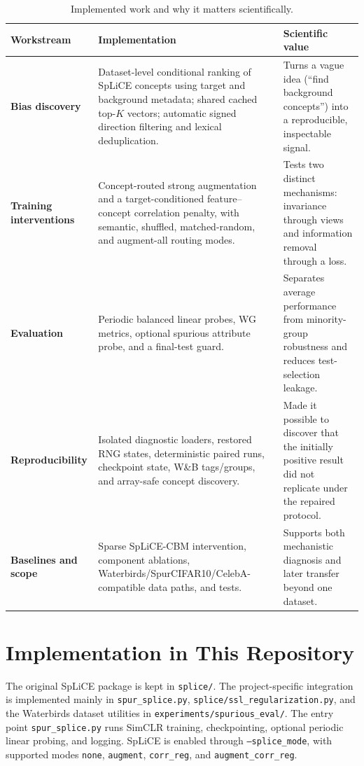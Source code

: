 \documentclass[11pt,a4paper]{article}
\begin{document}
\begin{table}[ht]
\centering
\caption{Implemented work and why it matters scientifically.}
\begin{tabularx}{\textwidth}{>{\bfseries}p{} X X}
\toprule
Workstream & Implementation & Scientific value \\
\midrule
Bias discovery & Dataset-level conditional ranking of SpLiCE concepts using
target and background metadata; shared cached top-$K$ vectors; automatic signed
direction filtering and lexical deduplication. & Turns a vague
idea (``find background concepts'') into a reproducible, inspectable signal. \\
Training interventions & Concept-routed strong augmentation and a
target-conditioned feature--concept correlation penalty, with semantic,
shuffled, matched-random, and augment-all routing modes. & Tests two distinct
mechanisms: invariance through views and information removal through a loss. \\
Evaluation & Periodic balanced linear probes, WG metrics, optional spurious
attribute probe, and a final-test guard. & Separates average performance from
minority-group robustness and reduces test-selection leakage. \\
Reproducibility & Isolated diagnostic loaders, restored RNG states, deterministic
paired runs, checkpoint state, W\&B tags/groups, and array-safe concept discovery. &
Made it possible to discover that the initially positive result did not
replicate under the repaired protocol. \\
Baselines and scope & Sparse SpLiCE-CBM intervention, component ablations,
Waterbirds/SpurCIFAR10/CelebA-compatible data paths, and tests. & Supports both
mechanistic diagnosis and later transfer beyond one dataset. \\
\bottomrule
\end{tabularx}
\end{table}

\section{Implementation in This Repository}

The original SpLiCE package is kept in \texttt{splice/}. The project-specific
integration is implemented mainly in \texttt{spur\_splice.py},
\texttt{splice/ssl\_regularization.py}, and the Waterbirds dataset utilities in
\texttt{experiments/spurious\_eval/}. The entry point \texttt{spur\_splice.py}
runs SimCLR training, checkpointing, optional periodic linear probing, and
logging. SpLiCE is enabled through \texttt{--splice\_mode}, with supported modes
\texttt{none}, \texttt{augment}, \texttt{corr\_reg}, and
\texttt{augment\_corr\_reg}.
\end{document}
